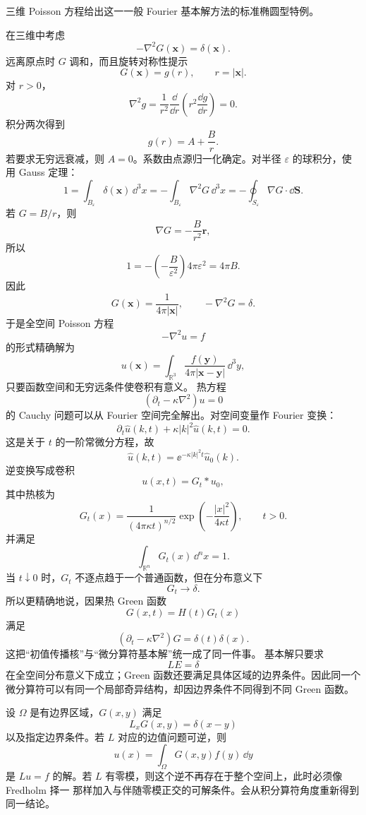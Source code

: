 三维 Poisson 方程给出这一一般 Fourier 基本解方法的标准椭圆型特例。

在三维中考虑
\[
-\nabla^2G(\mathbf x)=\delta(\mathbf x).
\]
远离原点时 $G$ 调和，而且旋转对称性提示
\[
G(\mathbf x)=g(r),
\qquad r=|\mathbf x|.
\]
对 $r>0$，
\[
\nabla^2g
=\frac1{r^2}\frac{\dd}{\dd r}
\left(r^2\frac{\dd g}{\dd r}\right)=0.
\]
积分两次得到
\[
g(r)=A+\frac{B}{r}.
\]
若要求无穷远衰减，则 $A=0$。系数由点源归一化确定。对半径 $\varepsilon$ 的球积分，使用 Gauss 定理：
\[
1=\int_{B_\varepsilon}\delta(\mathbf x)\,\dd^3x
=-\int_{B_\varepsilon}\nabla^2G\,\dd^3x
=-\oint_{S_\varepsilon}\nabla G\cdot\dd\mathbf S.
\]
若 $G=B/r$，则
\[
\nabla G=-\frac{B}{r^2}\hat{\mathbf r},
\]
所以
\[
1=-\left(-\frac{B}{\varepsilon^2}\right)4\pi\varepsilon^2
=4\pi B.
\]
因此
\begin{equation*}\boxed{
G(\mathbf x)=\frac1{4\pi|\mathbf x|},
\qquad
-\nabla^2G=\delta
}.\end{equation*}
于是全空间 Poisson 方程
\[
-\nabla^2u=f
\]
的形式精确解为
\[
u(\mathbf x)=\int_{\mathbb R^3}
\frac{f(\mathbf y)}{4\pi|\mathbf x-\mathbf y|}\,\dd^3y,
\]
只要函数空间和无穷远条件使卷积有意义。
热方程
\[
(\partial_t-\kappa\nabla^2)u=0
\]
的 Cauchy 问题可以从 Fourier 空间完全解出。对空间变量作 Fourier 变换：
\[
\partial_t\widehat u(k,t)+\kappa|k|^2\widehat u(k,t)=0.
\]
这是关于 $t$ 的一阶常微分方程，故
\[
\widehat u(k,t)=\ee^{-\kappa|k|^2t}\widehat u_0(k).
\]
逆变换写成卷积
\[
u(x,t)=G_t*u_0,
\]
其中热核为
\begin{equation*}\boxed{
G_t(x)=\frac1{(4\pi\kappa t)^{n/2}}
\exp\!\left(-\frac{|x|^2}{4\kappa t}\right),
\qquad t>0
}.\end{equation*}
并满足
\[
\int_{\mathbb R^n}G_t(x)\,\dd^nx=1.
\]
当 $t\downarrow0$ 时，$G_t$ 不逐点趋于一个普通函数，但在分布意义下
\[
G_t\longrightarrow\delta.
\]
所以更精确地说，因果热 Green 函数
\[
G(x,t)=H(t)G_t(x)
\]
满足
\[
(\partial_t-\kappa\nabla^2)G
=\delta(t)\delta(x).
\]
这把“初值传播核”与“微分算符基本解”统一成了同一件事。
基本解只要求
\[
L E=\delta
\]
在全空间分布意义下成立；Green 函数还要满足具体区域的边界条件。因此同一个微分算符可以有同一个局部奇异结构，却因边界条件不同得到不同 Green 函数。

设 $\Omega$ 是有边界区域，$G(x,y)$ 满足
\[
L_xG(x,y)=\delta(x-y)
\]
以及指定边界条件。若 $L$ 对应的边值问题可逆，则
\[
u(x)=\int_\Omega G(x,y)f(y)\,\dd y
\]
是 $Lu=f$ 的解。若 $L$ 有零模，则这个逆不再存在于整个空间上，此时必须像 Fredholm 择一 那样加入与伴随零模正交的可解条件。会从积分算符角度重新得到同一结论。

